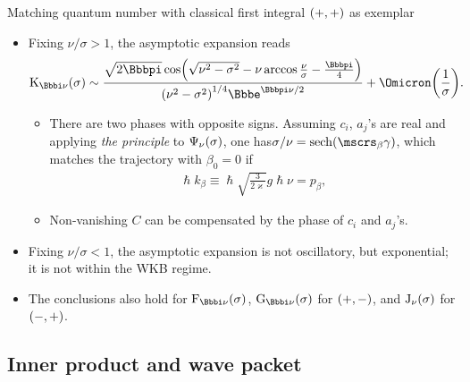 \documentclass[9pt]{beamer}
\begin{document}
\begin{frame}%
{Matching quantum number with classical first integral}%
{${\left(+,+\right)}$ as exemplar}
\begin{itemize}
\item Fixing $\nu/\sigma>1$, the asymptotic expansion
reads
\begin{align}
\rfun{\mathrm{K}_{\ii \nu}}{\sigma} \sim
\frac{\sqrt{2\pp}\,
\rfun{\cos}{\sqrt{\nu^2-\sigma^2}-\nu\arccos\frac{\nu}{\sigma}-\frac{\pp}{4}}
}{
\rbr{\nu^2-\sigma^2}^{1/4}\ee^{\pp\nu/2}}
+\rfun{\Omicron}{\frac{1}{\sigma}}.
\end{align}
\begin{itemize}
\item There are two phases with opposite signs.
Assuming $c_i$, $a_j$'s are real and applying \emph{the principle} to 
${\Psi_\nu}\mathopen{}\left(\sigma\right)\mathclose{}$, one has$\sigma/\nu = 
\rfun{\sech}{\mscrs_\beta\gamma}$, which matches the trajectory with
$\beta_0 = 0$ if
\begin{align}
\hslash k_\beta \equiv \hslash \sqrt{\frac{3}{2\varkappa}}g\hslash\nu
= p_\beta,
\end{align}

\item Non-vanishing $C$ can be compensated by the phase of $c_i$ and $a_j$'s.
\end{itemize}

\item Fixing $\nu/\sigma<1$, the asymptotic expansion is not oscillatory,
but exponential; it is not within the WKB regime.
\end{itemize}

\begin{itemize}
\item The conclusions also hold for $\rfun{\mathrm{F}_{\ii\nu}}{\sigma}$, 
$\rfun{\mathrm{G}_{\ii\nu}}{\sigma}$ for ${\left(+,-\right)}$, and
${\mathrm{J}_{\nu}}\mathopen{}\left(\sigma\right)\mathclose{}$ for ${\left(-,+\right)}$.
\end{itemize}
\end{frame}

\subsection{Inner product and wave packet}
\end{document}
